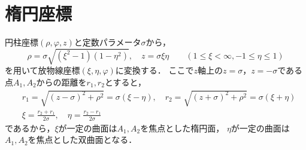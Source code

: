 \documentclass[a4paper,12pt]{jsarticle}
\begin{document}
	\section{楕円座標}
	円柱座標$(\rho, \varphi, z)$と定数パラメータ$\sigma$から，
	\begin{equation}
	\rho = \sigma \sqrt{\left(\xi^2 - 1\right)\left(1 - \eta^2\right)}, \quad
	z = \sigma \xi \eta \qquad
	(1 \le \xi < \infty, -1 \le \eta \le 1)
	\end{equation}
	を用いて放物線座標$(\xi, \eta, \varphi)$に変換する．
	ここで$z$軸上の$z=\sigma$，$z=-\sigma$である点$A_1,A_2$からの距離を$r_1,r_2$とすると，
	\begin{align}
	&r_1 = \sqrt{\left( z - \sigma \right)^2 + \rho^2}
	= \sigma (\xi - \eta), \quad
	r_2 = \sqrt{\left( z + \sigma \right)^2 + \rho^2}
	= \sigma (\xi + \eta) \\
	&\xi = \frac{r_2 + r_1}{2\sigma}, \quad
	\eta = \frac{r_2 - r_1}{2\sigma}
	\end{align}
	であるから，$\xi$が一定の曲面は$A_1, A_2$を焦点とした楕円面，
	$\eta$が一定の曲面は$A_1, A_2$を焦点とした双曲面となる．
	
\end{document}
